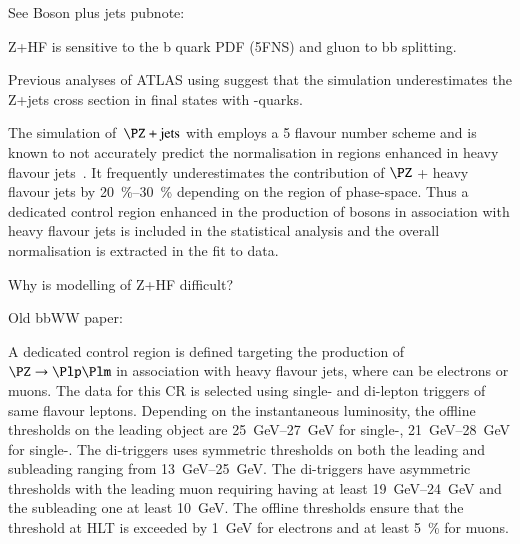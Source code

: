 %
%





See Boson plus jets pubnote: \cite{ATL-PHYS-PUB-2017-006}

Z+HF is sensitive to the b quark PDF (5FNS) and gluon to bb splitting.




Previous analyses of ATLAS using  suggest that the
simulation underestimates the Z+jets cross section in final states
with \Pbottom-quarks.

The simulation of~$\PZ+\text{jets}$ with  employs a 5
flavour number scheme and is known to not accurately predict the
normalisation in regions enhanced in heavy flavour
jets~\cite{HIGG-2016-29,STDM-2017-38}. It frequently underestimates the
contribution of $\PZ$ + heavy flavour jets by
\SIrange{20}{30}{\percent} depending on the region of
phase-space. Thus a dedicated control region enhanced in the
production of \PZ bosons in association with heavy flavour jets is
included in the statistical analysis and the overall normalisation is
extracted in the fit to data.

Why is modelling of Z+HF difficult?

Old bbWW paper: \cite{HDBS-2018-33}

A dedicated control region is defined targeting the production of
$\PZ \ra \Plp\Plm$ in association with heavy flavour jets, where \Pl
can be electrons or muons. The data for this CR is selected using
single- and di-lepton triggers of same flavour leptons. Depending on
the instantaneous luminosity, the offline thresholds on the leading
object \pT are \SIrange{25}{27}{\GeV} for single-\Pe,
\SIrange{21}{28}{\GeV} for single-\Pmu. The di-\Pe triggers uses
symmetric \pT thresholds on both the leading and subleading ranging
from \SIrange{13}{25}{\GeV}. The di-\Pmu triggers have asymmetric
thresholds with the leading muon requiring having at least
\SIrange{19}{24}{\GeV} \pT and the subleading one at least
\SI{10}{\GeV}. The offline \pT thresholds ensure that the threshold at
HLT is exceeded by \SI{1}{\GeV} for electrons and at least
\SI{5}{\percent} for muons.

